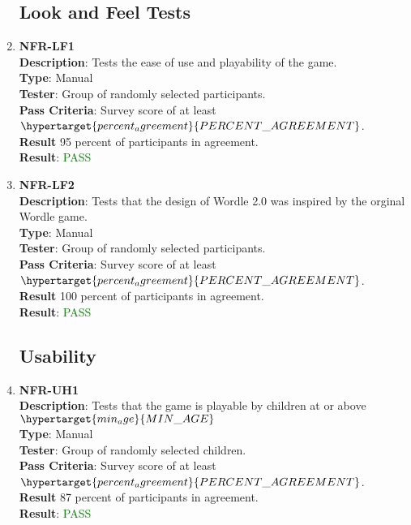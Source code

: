 \documentclass[12pt, titlepage]{article}
\begin{document}
\begin{enumerate}
\subsection{Look and Feel Tests}
\item \textbf{NFR-LF1\\}
\textbf{Description}: Tests the ease of use and playability of the game.\\
\textbf{Type}: Manual\\
\textbf{Tester}: Group of randomly selected participants.\\
\textbf{Pass Criteria}: Survey score of at least $\hypertarget{percent_agreement}{PERCENT\_AGREEMENT}$.\\
\textbf{Result} 95 percent of participants in agreement.\\
\textbf{Result}: \textcolor{green}{PASS}\\

\item \textbf{NFR-LF2\\}
\textbf{Description}: Tests that the design of Wordle 2.0 was inspired by the orginal Wordle game.\\
\textbf{Type}: Manual\\
\textbf{Tester}: Group of randomly selected participants.\\
\textbf{Pass Criteria}: Survey score of at least $\hypertarget{percent_agreement}{PERCENT\_AGREEMENT}$.\\
\textbf{Result} 100 percent of participants in agreement.\\
\textbf{Result}: \textcolor{green}{PASS}\\
\subsection{Usability}

\item \textbf{NFR-UH1\\}
\textbf{Description}: Tests that the game is playable by children at or above $\hypertarget{min_age}{MIN\_AGE}$ \\
\textbf{Type}: Manual\\
\textbf{Tester}: Group of randomly selected children.\\
\textbf{Pass Criteria}: Survey score of at least $\hypertarget{percent_agreement}{PERCENT\_AGREEMENT}$.\\
\textbf{Result} 87 percent of participants in agreement.\\
\textbf{Result}: \textcolor{green}{PASS}\\


\end{enumerate}
\end{document}
